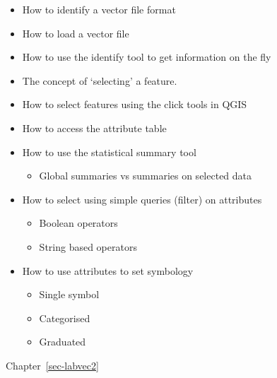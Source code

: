 \documentclass[
  letterpaper,
  DIV=11,
  numbers=noendperiod]{scrreprt}
\providecommand{\tightlist}{%
  \setlength{\itemsep}{0pt}\setlength{\parskip}{0pt}}\usepackage{longtable,booktabs,array}
\begin{document}
\begin{itemize}
\tightlist
\item
  How to identify a vector file format
\item
  How to load a vector file
\item
  How to use the identify tool to get information on the fly
\item
  The concept of `selecting' a feature.
\item
  How to select features using the click tools in QGIS
\item
  How to access the attribute table
\item
  How to use the statistical summary tool

  \begin{itemize}
  \tightlist
  \item
    Global summaries vs summaries on selected data
  \end{itemize}
\item
  How to select using simple queries (filter) on attributes

  \begin{itemize}
  \tightlist
  \item
    Boolean operators
  \item
    String based operators
  \end{itemize}
\item
  How to use attributes to set symbology

  \begin{itemize}
  \tightlist
  \item
    Single symbol
  \item
    Categorised
  \item
    Graduated
  \end{itemize}
\end{itemize}

Chapter~\ref{sec-labvec2}
\end{document}
